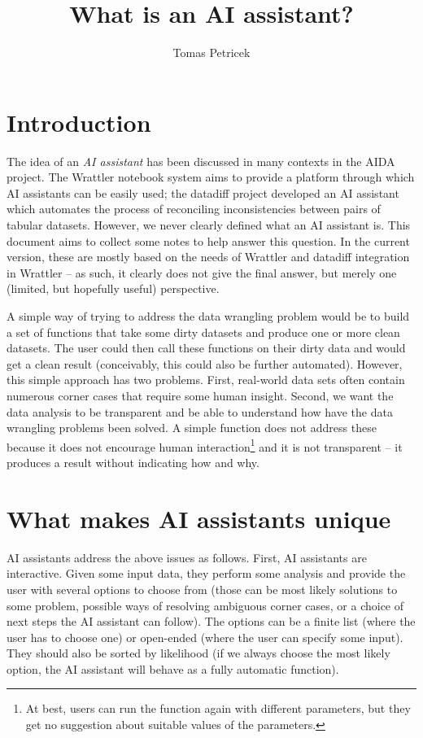 \documentclass{article}
\begin{document}
\title{What is an AI assistant?}
\author{Tomas Petricek}
\maketitle

\newcommand{\ident}[1]{\textnormal{\sffamily #1}}

\section{Introduction}
The idea of an \emph{AI assistant} has been discussed in many contexts in the AIDA project.
The Wrattler notebook system aims to provide a platform through which AI assistants can be 
easily used; the datadiff project developed an AI assistant which automates the process of 
reconciling inconsistencies between pairs of tabular datasets. However, we never clearly defined
what an AI assistant is. This document aims to collect some notes to help answer this question.
In the current version, these are mostly based on the needs of Wrattler and datadiff integration
in Wrattler -- as such, it clearly does not give the final answer, but merely one (limited, but
hopefully useful) perspective.

A simple way of trying to address the data wrangling problem would be to build a set of functions
that take some dirty datasets and produce one or more clean datasets. The user could then call these
functions on their dirty data and would get a clean result (conceivably, this could also be further 
automated). However, this simple approach has two problems. First, real-world data sets often 
contain numerous corner cases that require some human insight. Second, we want the data analysis
to be transparent and be able to understand how have the data wrangling problems been solved. 
A simple function does not address these because it does not encourage human interaction\footnote{At
best, users can run the function again with different parameters, but they get no suggestion about 
suitable values of the parameters.} and it is not transparent -- it produces a result without 
indicating how and why.

\section{What makes AI assistants unique}

AI assistants address the above issues as follows. First, AI assistants are interactive. Given 
some input data, they perform some analysis and provide the user with several options to choose 
from (those can be most likely solutions to some problem, possible ways of resolving ambiguous
corner cases, or a choice of next steps the AI assistant can follow). The options can be a finite
list (where the user has to choose one) or open-ended (where the user can specify some input).
They should also be sorted by likelihood (if we always choose the most likely option, the AI
assistant will behave as a fully automatic function).
\end{document}
